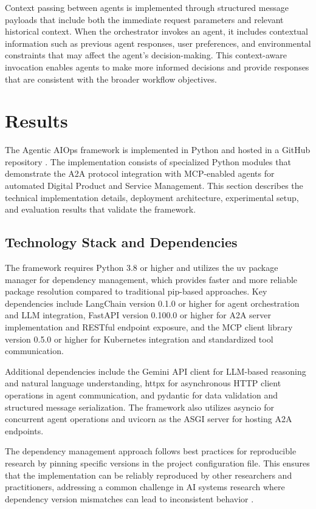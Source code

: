 \documentclass{article}
\begin{document}
Context passing between agents is implemented through structured message payloads that include both the immediate request parameters and relevant historical context. When the orchestrator invokes an agent, it includes contextual information such as previous agent responses, user preferences, and environmental constraints that may affect the agent's decision-making. This context-aware invocation enables agents to make more informed decisions and provide responses that are consistent with the broader workflow objectives.

\section{Results}

The Agentic AIOps framework is implemented in Python and hosted in a GitHub repository \cite{rubio2025github}. The implementation consists of specialized Python modules that demonstrate the A2A protocol integration with MCP-enabled agents for automated Digital Product and Service Management. This section describes the technical implementation details, deployment architecture, experimental setup, and evaluation results that validate the framework.

\subsection{Technology Stack and Dependencies}

The framework requires Python 3.8 or higher and utilizes the uv package manager for dependency management, which provides faster and more reliable package resolution compared to traditional pip-based approaches. Key dependencies include LangChain version 0.1.0 or higher for agent orchestration and LLM integration, FastAPI version 0.100.0 or higher for A2A server implementation and RESTful endpoint exposure, and the MCP client library version 0.5.0 or higher for Kubernetes integration and standardized tool communication.

Additional dependencies include the Gemini API client for LLM-based reasoning and natural language understanding, httpx for asynchronous HTTP client operations in agent communication, and pydantic for data validation and structured message serialization. The framework also utilizes asyncio for concurrent agent operations and uvicorn as the ASGI server for hosting A2A endpoints.

The dependency management approach follows best practices for reproducible research by pinning specific versions in the project configuration file. This ensures that the implementation can be reliably reproduced by other researchers and practitioners, addressing a common challenge in AI systems research where dependency version mismatches can lead to inconsistent behavior \cite{sculley2015}.
\end{document}

